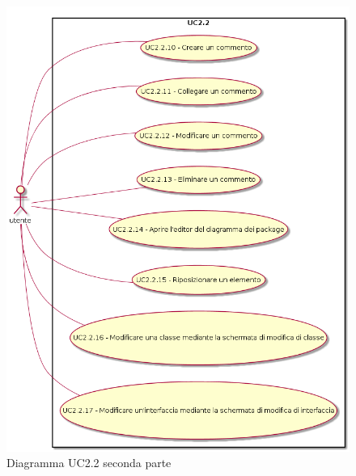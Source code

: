 \documentclass[../AnalisiDeiRequisiti.tex]{subfiles}
\begin{document}
	\begin{figure} [H]
		\centering
		\includegraphics[scale=0.45]{./Figures/UC2-2b.png}
		\caption{Diagramma UC2.2 seconda parte}\label{}
	\end{figure}
\end{document}
